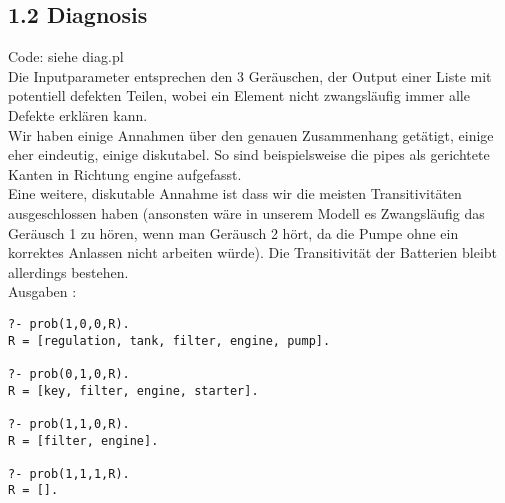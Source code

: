 \documentclass[a4paper,11pt,fleqn]{scrartcl}
\begin{document}
\subsection*{1.2 Diagnosis}
Code: siehe diag.pl \\
Die Inputparameter entsprechen den 3 Geräuschen, der Output einer Liste mit potentiell defekten Teilen, wobei ein Element nicht zwangsläufig immer alle Defekte erklären kann. \\
Wir haben einige Annahmen über den genauen Zusammenhang getätigt, einige eher eindeutig, einige diskutabel. So sind beispielsweise die pipes als gerichtete Kanten in Richtung engine aufgefasst. \\
Eine weitere, diskutable Annahme ist dass wir die meisten Transitivitäten ausgeschlossen haben (ansonsten wäre in unserem Modell es Zwangsläufig das Geräusch 1 zu hören, wenn man Geräusch 2 hört, da die Pumpe ohne ein korrektes Anlassen nicht arbeiten würde). Die Transitivität der Batterien bleibt allerdings bestehen. \\
Ausgaben :
\begin{verbatim}
?- prob(1,0,0,R).
R = [regulation, tank, filter, engine, pump].

?- prob(0,1,0,R).
R = [key, filter, engine, starter].

?- prob(1,1,0,R).
R = [filter, engine].

?- prob(1,1,1,R).
R = [].
\end{verbatim}
\end{document}
